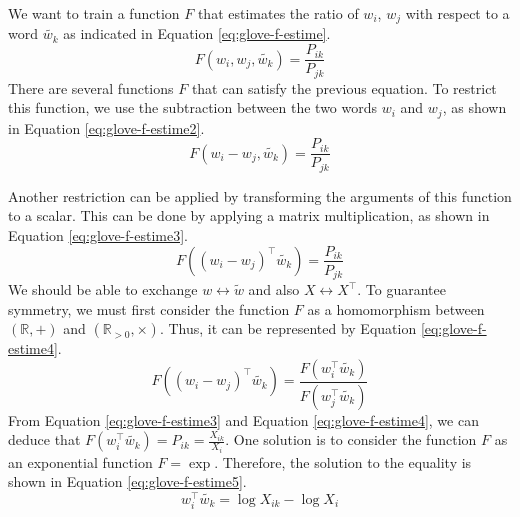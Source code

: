 \documentclass{KBook}
\begin{document}

We want to train a function $F$ that estimates the ratio of $w_i$, $w_j$ with respect to a word $\tilde{w_k}$ as indicated in Equation \ref{eq:glove-f-estime}.
\begin{equation}
	F(w_i, w_j, \tilde{w_k}) = \frac{P_{ik}}{P_{jk}}
	\label{eq:glove-f-estime}
\end{equation}
There are several functions $F$ that can satisfy the previous equation. To restrict this function, we use the subtraction between the two words $w_i$ and $w_j$, as shown in Equation \ref{eq:glove-f-estime2}.
\begin{equation}
	F(w_i - w_j, \tilde{w_k}) = \frac{P_{ik}}{P_{jk}}
	\label{eq:glove-f-estime2}
\end{equation}

Another restriction can be applied by transforming the arguments of this function to a scalar. This can be done by applying a matrix multiplication, as shown in Equation \ref{eq:glove-f-estime3}.
\begin{equation}
	F((w_i - w_j)^\top \tilde{w_k}) = \frac{P_{ik}}{P_{jk}}
	\label{eq:glove-f-estime3}
\end{equation}
We should be able to exchange $w \leftrightarrow \tilde{w}$ and also $X \leftrightarrow X^\top$. To guarantee symmetry, we must first consider the function $F$ as a homomorphism between $(\mathbb{R}, +)$ and $(\mathbb{R}_{>0}, \times)$. Thus, it can be represented by Equation \ref{eq:glove-f-estime4}.
\begin{equation}
	F((w_i - w_j)^\top \tilde{w_k}) = \frac{F(w_i^\top \tilde{w_k})}{F(w_j^\top \tilde{w_k})}
	\label{eq:glove-f-estime4}
\end{equation}
From Equation \ref{eq:glove-f-estime3} and Equation \ref{eq:glove-f-estime4}, we can deduce that $F(w_i^\top \tilde{w_k}) = P_{ik} = \frac{X_{ik}}{X_i}$. One solution is to consider the function $F$ as an exponential function $F=\exp$. Therefore, the solution to the equality is shown in Equation \ref{eq:glove-f-estime5}.
\begin{equation}
	w_i^\top \tilde{w_k} = \log X_{ik} - \log X_i
	\label{eq:glove-f-estime5}
\end{equation}
\end{document}
